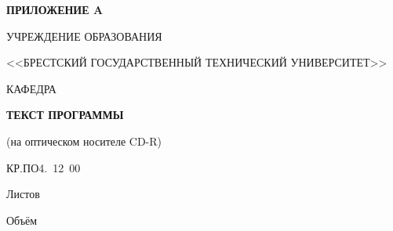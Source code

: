 \begin{center}
    \hspace{.6\textwidth}\textbf{ПРИЛОЖЕНИЕ A}

    \hspace{0pt}

    УЧРЕЖДЕНИЕ ОБРАЗОВАНИЯ

    <<БРЕСТСКИЙ ГОСУДАРСТВЕННЫЙ ТЕХНИЧЕСКИЙ УНИВЕРСИТЕТ>>

    \hspace{0pt}

    КАФЕДРА \titlePageKafedra
\end{center}

\vfill

\begin{center}
    \titlePageTopic

    \hspace{0pt}

    \textbf{ТЕКСТ ПРОГРАММЫ}

    (на оптическом носителе CD-R)
\end{center}

\vfill

\begin{center}
    КР.ПО4.\titlePageNumberWork~12~00

    \hspace{0pt}

    Листов \pageref{LastPage}

    Объём \diskVolume
\end{center}

\vfill

